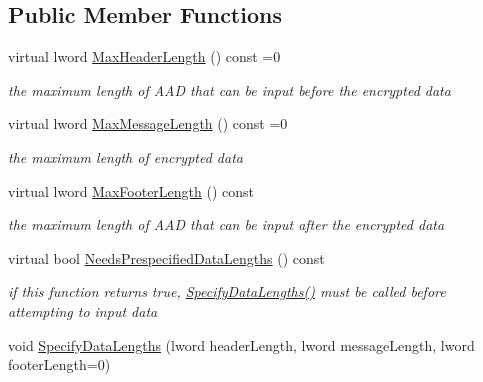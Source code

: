 \subsection*{Public Member Functions}
\begin{DoxyCompactItemize}
\item 
\hypertarget{class_authenticated_symmetric_cipher_a2f15306daa15eebe988df98a9c7386b0}{
virtual lword \hyperlink{class_authenticated_symmetric_cipher_a2f15306daa15eebe988df98a9c7386b0}{MaxHeaderLength} () const =0}
\label{class_authenticated_symmetric_cipher_a2f15306daa15eebe988df98a9c7386b0}

\begin{DoxyCompactList}\small\item\em the maximum length of AAD that can be input before the encrypted data \item\end{DoxyCompactList}\item 
\hypertarget{class_authenticated_symmetric_cipher_a89bf90afafec009ac52321e1a97698d1}{
virtual lword \hyperlink{class_authenticated_symmetric_cipher_a89bf90afafec009ac52321e1a97698d1}{MaxMessageLength} () const =0}
\label{class_authenticated_symmetric_cipher_a89bf90afafec009ac52321e1a97698d1}

\begin{DoxyCompactList}\small\item\em the maximum length of encrypted data \item\end{DoxyCompactList}\item 
\hypertarget{class_authenticated_symmetric_cipher_a2307840ae74d2c4a1cc028d4aff903b3}{
virtual lword \hyperlink{class_authenticated_symmetric_cipher_a2307840ae74d2c4a1cc028d4aff903b3}{MaxFooterLength} () const }
\label{class_authenticated_symmetric_cipher_a2307840ae74d2c4a1cc028d4aff903b3}

\begin{DoxyCompactList}\small\item\em the maximum length of AAD that can be input after the encrypted data \item\end{DoxyCompactList}\item 
virtual bool \hyperlink{class_authenticated_symmetric_cipher_a52595d1c7b43c7a416da2fffba46330b}{NeedsPrespecifiedDataLengths} () const 
\begin{DoxyCompactList}\small\item\em if this function returns true, \hyperlink{class_authenticated_symmetric_cipher_a7684bed45aa7e8b19de43fcb25b68c57}{SpecifyDataLengths()} must be called before attempting to input data \item\end{DoxyCompactList}\item 
\hypertarget{class_authenticated_symmetric_cipher_a7684bed45aa7e8b19de43fcb25b68c57}{
void \hyperlink{class_authenticated_symmetric_cipher_a7684bed45aa7e8b19de43fcb25b68c57}{SpecifyDataLengths} (lword headerLength, lword messageLength, lword footerLength=0)}
\label{class_authenticated_symmetric_cipher_a7684bed45aa7e8b19de43fcb25b68c57}


\end{DoxyCompactItemize}
